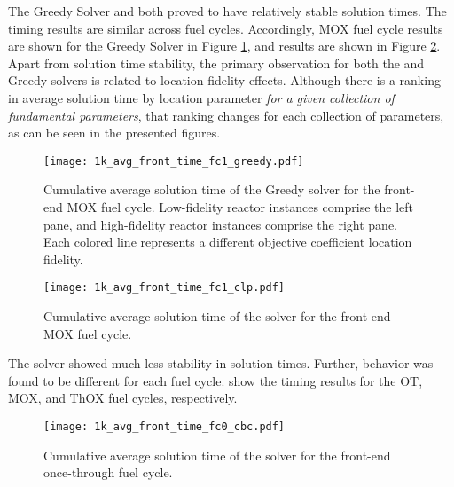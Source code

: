 The Greedy Solver and \clp both proved to have relatively stable solution
times. The timing results are similar across fuel cycles. Accordingly, MOX fuel
cycle results are shown for the Greedy Solver in Figure
\ref{fig:1k_avg_front_time_fc1_greedy}, and \clp results are shown in Figure
\ref{fig:1k_avg_front_time_fc1_clp}. Apart from solution time stability, the
primary observation for both the \clp and Greedy solvers is related to location
fidelity effects. Although there is a ranking in average solution time by
location parameter \textit{for a given collection of fundamental parameters},
that ranking changes for each collection of parameters, as can be seen in the
presented figures.

\begin{figure}[h!]
  \begin{center}
    \texttt{[image: 1k\_avg\_front\_time\_fc1\_greedy.pdf]}
    \caption{
      \label{fig:1k_avg_front_time_fc1_greedy}
      Cumulative average solution time of the Greedy solver for the front-end
      MOX fuel cycle. Low-fidelity reactor instances comprise the left pane, and
      high-fidelity reactor instances comprise the right pane. Each colored line
      represents a different objective coefficient location fidelity.}
  \end{center}
\end{figure}

\begin{figure}[h!]
  \begin{center}
    \texttt{[image: 1k\_avg\_front\_time\_fc1\_clp.pdf]}
    \caption{
      \label{fig:1k_avg_front_time_fc1_clp}
      Cumulative average solution time of the \clp solver for the front-end MOX fuel
      cycle.}
  \end{center}
\end{figure}

The \cbc solver showed much less stability in solution times. Further, behavior
was found to be different for each fuel
cycle. 
show the timing results for the OT, MOX, and ThOX fuel cycles,
respectively. 

\begin{figure}[h!]
  \begin{center}
    \texttt{[image: 1k\_avg\_front\_time\_fc0\_cbc.pdf]}
    \caption{
      \label{fig:1k_avg_front_time_fc0_cbc}
      Cumulative average solution time of the \cbc solver for the front-end
      once-through fuel cycle.}
  \end{center}
\end{figure}

